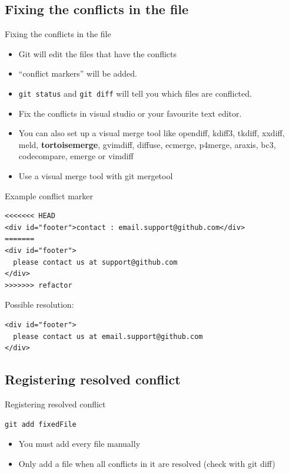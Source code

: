 \documentclass[10pt,a4paper]{beamer}
\begin{document}
\subsection{Fixing the conflicts in the file}
\begin{frame}[fragile]{Fixing the conflicts in the file}
\begin{itemize}
\item Git will edit the files that have the conflicts
\item ``conflict markers'' will be added.
\item \texttt{git status} and \texttt{git diff} will tell you which files are conflicted.
\item Fix the conflicts in visual studio or your favourite text editor.
\item You can also set up a visual merge tool like opendiff, kdiff3, tkdiff, xxdiff, meld, \textbf{tortoisemerge}, gvimdiff, diffuse, ecmerge, p4merge, araxis, bc3, codecompare, emerge or vimdiff
\item Use a visual merge tool with git mergetool
\end{itemize}
\end{frame}

\begin{frame}[fragile]{Example conflict marker}
\begin{verbatim}
<<<<<<< HEAD
<div id="footer">contact : email.support@github.com</div>
=======
<div id="footer">
  please contact us at support@github.com
</div>
>>>>>>> refactor
\end{verbatim}

Possible resolution:
\begin{verbatim}
<div id="footer">
  please contact us at email.support@github.com
</div>
\end{verbatim}
\end{frame}

\subsection{Registering resolved conflict}
\begin{frame}[fragile]{Registering resolved conflict}
\begin{verbatim}
git add fixedFile
\end{verbatim}
\begin{itemize}
\item You must add every file manually
\item Only add a file when all conflicts in it are resolved (check with git diff)

\end{itemize}
\end{frame}
\end{document}
